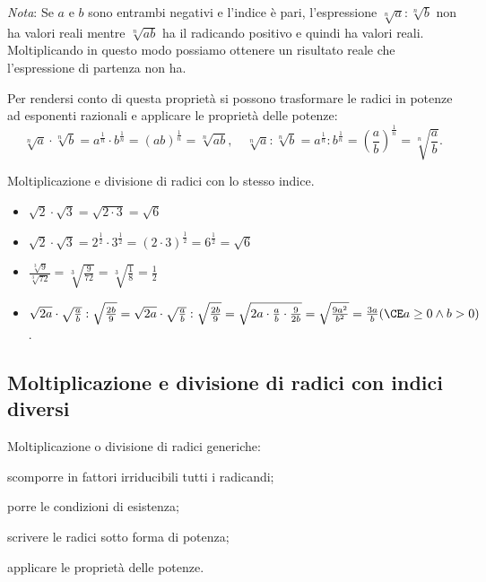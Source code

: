 \emph{Nota}: 
 Se $a$ e $b$ sono entrambi negativi e l'indice è pari, l'espressione
 $\sqrt[n]a:\sqrt[n]b$ non ha valori reali mentre $\sqrt[n]{ab}$ ha il
 radicando positivo e quindi ha valori reali. Moltiplicando in questo modo 
 possiamo ottenere un risultato reale che l'espressione di partenza non ha.

Per rendersi conto di questa proprietà si possono trasformare le radici in 
potenze ad esponenti razionali e applicare le proprietà delle potenze:
 \[\sqrt[n]a\cdot \sqrt[n]b=a^{\frac 1 n}\cdot b^{\frac 1 n}=(ab)^{\frac 1 n}=
   \sqrt[n]{ab},\quad \sqrt[n]a:\sqrt[n]b=a^{\frac 1 n}:b^{\frac 1 n}=
   \left(\dfrac a b\right)^{\frac 1 n}=\sqrt[n]{\dfrac a b}.\]

\begin{exrig}
 \begin{esempio}
Moltiplicazione e divisione di radici con lo stesso indice.
\begin{itemize}
\item $\sqrt{2} \cdot \sqrt{3}=\sqrt{2 \cdot 3}=\sqrt 6$
\item $\sqrt{2} \cdot \sqrt{3}=
       2^{\frac{1}{2}} \cdot 3^{\frac{1}{2}}=(2  \cdot 3)^{\frac{1}{2}}=
       6^{\frac{1}{2}}=\sqrt 6$
\item $\frac{\sqrt[3]9}{\sqrt[3]{72}}=\sqrt[3]{\frac 9{72}}=
       \sqrt[3]{\frac 1 8}=\frac 1 2$
\item $\sqrt{2a}\cdot \sqrt{\frac a b}:\sqrt{\frac {2b} 9}=
       \sqrt{2a}\cdot \sqrt{\frac a b}:\sqrt{\frac {2b} 9}=
       \sqrt{2a\cdot \frac a b\cdot \frac 9{2b}}=\sqrt{\frac{9a^2}{b^2}}=
       \frac {3a} b 
      (\CE a\ge 0\wedge b>0)$.
\end{itemize}
 \end{esempio}
\end{exrig}

\subsection{Moltiplicazione e divisione di radici con indici diversi}

\begin{procedura}
Moltiplicazione o divisione di radici generiche:
\begin{enumeratea}
 \item scomporre in fattori irriducibili tutti i radicandi;
 \item porre le condizioni di esistenza;
 \item scrivere le radici sotto forma di potenza;
 \item applicare le proprietà delle potenze.
\end{enumeratea}
\end{procedura}

